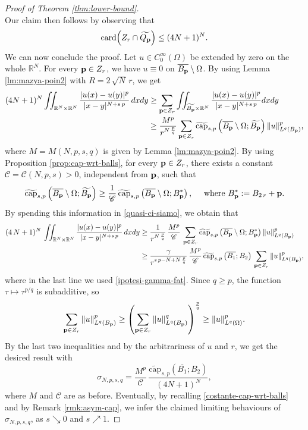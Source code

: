 \documentclass{amsart}
\theoremstyle{definition}
\numberwithin{equation}{section}
\begin{document}
\begin{proof}[Proof of Theorem \ref{thm:lower-bound}]
\[	\]
	Our claim then follows by observing that \[
	{\rm card}\Big(Z_r \cap \widetilde{Q_{\bf p}}\Big) \le (4N+1)^N.
	\] 
	We can now conclude the proof. Let $u \in C^\infty_0(\Omega)$ be extended by zero on the whole $\mathbb{R}^N$. For every ${\bf p} \in Z_r$, we have $u \equiv 0$ on $\overline{B_{\bf p}} \setminus \Omega$. By using Lemma \ref{lm:mazya-poin2} with $R = 2\,\sqrt{N}\,r$, we get
	\begin{equation} \label{quasi-ci-siamo}
		\begin{split}
			(4N+1)^N \iint_{\mathbb{R}^N \times \mathbb{R}^N} \frac{|u(x) - u(y)|^p}{|x-y|^{N+s\,p}}\,dxdy &\ge \sum_{{\bf p}\in Z_r} \iint_{\widetilde{B_{\bf p}} \times \mathbb{R}^N} \frac{|u(x) - u(y)|^p}{|x-y|^{N+s\,p}}dxdy \\
			&\ge \frac{M^p}{r^{N\,\frac{p}{q}}} \sum_{{\bf p}\in Z_r} \widetilde{\rm cap}_{s,p}\left(\overline{B_{\bf p}} \setminus \Omega; \widetilde{B_{\bf p}}\right) \|u\|^p_{L^q(B_{{\bf p}})},
		\end{split}
	\end{equation}
	where $M = M\left(N,p, s, q\right)$ is given by Lemma \ref{lm:mazya-poin2}. By using Proposition \ref{prop:cap-wrt-balls}, for every ${\bf p} \in Z_r$, there exists a constant $\mathscr{C} = \mathscr{C}\left(N,p, s\right) > 0$, independent from ${\bf p}$, such that 
	\[
	\widetilde{\rm cap}_{s,p}\left(\overline{B_{\bf p}} \setminus \Omega; \widetilde{B_{\bf p}}\right) \ge \frac{1}{\mathscr{C}}\,\widetilde{\rm cap}_{s,p}\left(\overline{B_{\bf p}} \setminus \Omega; B^*_{\bf p}\right), \quad \mbox{ where } B^*_{\bf p}:= B_{2\,r} + {\bf p}.
	\]
	By spending this information in \eqref{quasi-ci-siamo}, we obtain that 
	\[
	\begin{split}
		(4\,N+1)^N\,\iint_{\mathbb{R}^N \times \mathbb{R}^N} \frac{|u(x) - u(y)|^p}{|x-y|^{N+s\,p}}\,dxdy &\ge \frac{1}{r^{N\,\frac{p}{q}}}\,\frac{M^p}{\mathscr{C}}\, \sum_{{\bf p}\in Z_r} \widetilde{\rm cap}_{s,p}\left(\overline{B_{\bf p}} \setminus \Omega; B^*_{\bf p}\right) \|u\|^p_{L^q(B_{{\bf p}})} \\
		&\ge \frac{\gamma}{r^{s\,p - N + N\,\frac{p}{q}}}\,\frac{M^p}{\mathscr{C}}\,\widetilde{{\rm cap}}_{s,p}\left(\overline{B_1}; B_2\right)\,\sum_{{\bf p}\in Z_r} \|u\|^p_{L^q(B_{{\bf p}})},
	\end{split}
	\]
	where in the last line we used \eqref{ipotesi-gamma-fat}.
	Since $q \ge p$, the function $\tau \mapsto \tau^{p/q}$ is subadditive, so
	\[
	\sum_{{\bf p}\in Z_r} \|u\|^p_{L^q(B_{{\bf p}})} \ge \left(\sum_{{\bf p}\in Z_r} \|u\|^q_{L^q(B_{\bf p})}\right)^{\frac{p}{q}} \ge \|u\|^{p}_{L^q(\Omega)}.
	\]
	By the last two inequalities and by the arbitrariness of $u$ and $r$, we get the desired result with
	\[
	\sigma_{N, p, s, q} = \dfrac{M^{{p}}}{\mathscr{C}}\,\frac{\widetilde{\mathrm{cap}}_{s,p}\left(\overline{B_1};B_2\right)}{(4N+1)^N},
	\]
	where $M$ and $\mathscr{C}$ are as before. Eventually, by recalling \eqref{costante-cap-wrt-balls} and by Remark \ref{rmk:asym-cap}, we infer the claimed limiting behaviours of $\sigma_{N, p, s, q}$, as $s \searrow 0$ and $s \nearrow 1$.
\end{proof}
\end{document}
